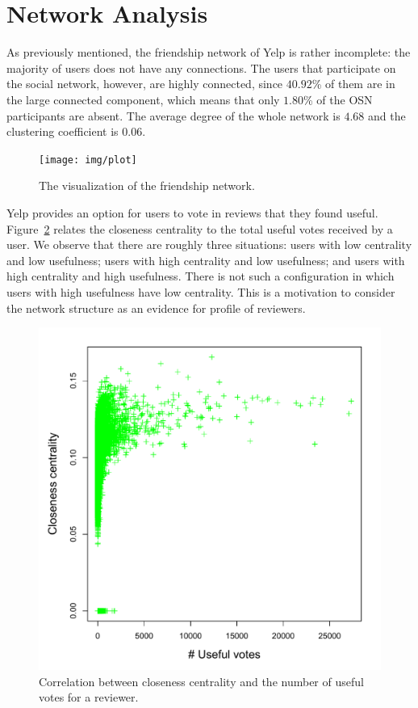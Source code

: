 \section{Network Analysis}
As previously mentioned, the friendship network of Yelp is rather incomplete: the majority of users does not have any connections. The users that participate on the social network, however, are highly connected, since $40.92$\% of them are in the large connected component, which means that only $1.80$\% of the OSN participants are absent. The average degree of the whole network is $4.68$ and the clustering coefficient is $0.06$.

\begin{figure}[H]
\centering
\texttt{[image: img/plot]}
\caption{The visualization of the friendship network.}
\label{fig:plot}
\end{figure}

Yelp provides an option for users to vote in reviews that they found useful. Figure~\ref{fig:clo_use} relates the closeness centrality to the total useful votes received by a user. We observe that there are roughly three situations: users with low centrality and low usefulness; users with high centrality and low usefulness; and users with high centrality and high usefulness. There is not such a configuration in which users with high usefulness have low centrality. This is a motivation to consider the network structure as an evidence for profile of reviewers.

\begin{figure}[H]
\centering
\includegraphics[scale=0.5]{img/close_useful_scatter}
\caption{Correlation between closeness centrality and the number of useful votes for a reviewer.}
\label{fig:clo_use}
\end{figure}

